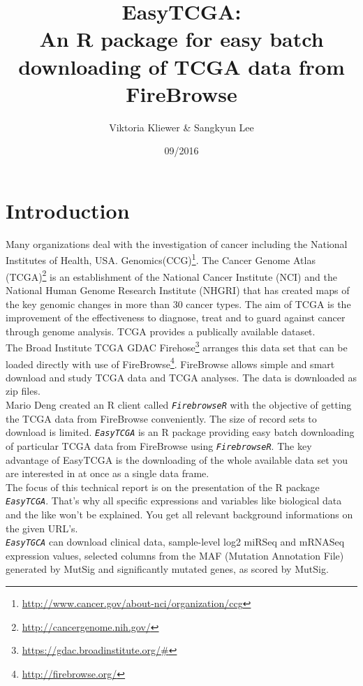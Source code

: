 \documentclass{TechReport}
\title{EasyTCGA:\\ An R package for easy batch downloading of TCGA data from FireBrowse}
\author{Viktoria Kliewer \& Sangkyun Lee}
\date{09/2016}        %
\begin{document}
\makesfbtitlepage



\section{Introduction}
Many organizations deal with the investigation of cancer including the National
Institutes of Health, USA.
Genomics(CCG)\footnote{\url{http://www.cancer.gov/about-nci/organization/ccg}}. 
The Cancer Genome Atlas (TCGA)\footnote{\url{http://cancergenome.nih.gov/}} is an
establishment of the
National Cancer Institute (NCI) and the National Human Genome Research Institute
(NHGRI)
that has created maps of the key genomic changes in more than 30 cancer types. The
aim of TCGA is the improvement
of the effectiveness to diagnose, treat and to guard against cancer through genome
analysis. TCGA provides a
publically available dataset.\\
The Broad Institute TCGA GDAC
Firehose\footnote{\url{https://gdac.broadinstitute.org/#}} arranges this
data set that can be loaded directly with use of
FireBrowse\footnote{\url{http://firebrowse.org/}}. FireBrowse allows
simple and smart download and study TCGA data and TCGA analyses. The data is
downloaded as zip files.\\
Mario Deng created an R client called \texttt{\em FirebrowseR} with the objective of
getting the TCGA data from FireBrowse conveniently.
The size of record sets to download is limited. \texttt{\em EasyTCGA} is an R
package providing easy batch downloading of particular
TCGA data from FireBrowse using \texttt{\em FirebrowseR}. The key advantage of
EasyTCGA is the downloading of the whole available
data set you are interested in at once as a single data frame. \\
The focus of this technical report is on the presentation of the R package
\texttt{\em EasyTCGA}. That's why all specific expressions and variables 
like biological data and the like won't be explained. You get all relevant
background informations on the given URL's.\\
\texttt{\em EasyTGCA} can download clinical data, sample-level log2 miRSeq and
mRNASeq expression values, selected columns
from the MAF (Mutation Annotation File) generated by MutSig and significantly
mutated genes, as scored by MutSig.\\
\end{document}
